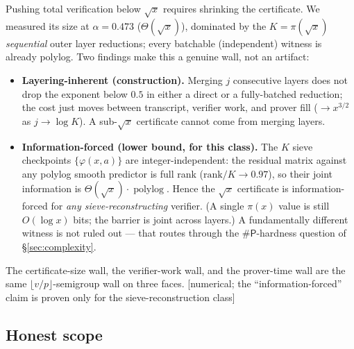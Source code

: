 \documentclass[11pt]{article}
\theoremstyle{plain}
\theoremstyle{definition}
\theoremstyle{remark}
\newcommand{\stat}[1]{\quad\textnormal{\footnotesize\textsf{[\textcolor{accent}{#1}]}}}
\DeclareMathOperator{\polylog}{polylog}
\newcommand{\sharpP}{\#\mathsf{P}}
\begin{document}
Pushing total verification below $\sqrt{x}$ requires shrinking the certificate.
We measured its size at $\alpha=0.473$ ($\Theta(\sqrt{x})$), dominated by the
$K=\pi(\sqrt{x})$ \emph{sequential} outer layer reductions; every batchable
(independent) witness is already polylog. Two findings make this a genuine wall,
not an artifact:
\begin{itemize}[leftmargin=1.4em,itemsep=2pt]
\item \textbf{Layering-inherent (construction).} Merging $j$ consecutive layers
does not drop the exponent below $0.5$ in either a direct or a fully-batched
reduction; the cost just moves between transcript, verifier work, and prover
fill ($\to x^{3/2}$ as $j\to\log K$). A sub-$\sqrt{x}$ certificate cannot come
from merging layers.
\item \textbf{Information-forced (lower bound, for this class).} The $K$ sieve
checkpoints $\{\varphi(x,a)\}$ are integer-independent: the residual matrix
against any polylog smooth predictor is full rank ($\mathrm{rank}/K\to0.97$),
so their joint information is $\Theta(\sqrt{x})\cdot\polylog$. Hence the
$\sqrt{x}$ certificate is information-forced for \emph{any sieve-reconstructing}
verifier. (A single $\pi(x)$ value is still $O(\log x)$ bits; the barrier is
joint across layers.) A fundamentally different witness is not ruled out --- that
routes through the $\sharpP$-hardness question of \S\ref{sec:complexity}.
\end{itemize}
The certificate-size wall, the verifier-work wall, and the prover-time wall are
the same $\lfloor v/p\rfloor$-semigroup wall on three faces.
\stat{numerical; the ``information-forced'' claim is proven only for the sieve-reconstruction class}

\subsection{Honest scope}
\end{document}
